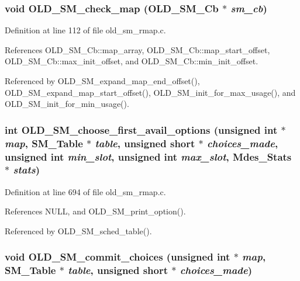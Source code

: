 \subsubsection{\setlength{\rightskip}{0pt plus 5cm}void OLD\_\-SM\_\-check\_\-map (\bf{OLD\_\-SM\_\-Cb} $\ast$ {\em sm\_\-cb})}\label{old__sm__rmap_8c_18f0c2176ab8e4618d61b0c3bdcb92fc}




Definition at line 112 of file old\_\-sm\_\-rmap.c.

References OLD\_\-SM\_\-Cb::map\_\-array, OLD\_\-SM\_\-Cb::map\_\-start\_\-offset, OLD\_\-SM\_\-Cb::max\_\-init\_\-offset, and OLD\_\-SM\_\-Cb::min\_\-init\_\-offset.

Referenced by OLD\_\-SM\_\-expand\_\-map\_\-end\_\-offset(), OLD\_\-SM\_\-expand\_\-map\_\-start\_\-offset(), OLD\_\-SM\_\-init\_\-for\_\-max\_\-usage(), and OLD\_\-SM\_\-init\_\-for\_\-min\_\-usage().
\subsubsection{\setlength{\rightskip}{0pt plus 5cm}int OLD\_\-SM\_\-choose\_\-first\_\-avail\_\-options (unsigned int $\ast$ {\em map}, SM\_\-Table $\ast$ {\em table}, unsigned short $\ast$ {\em choices\_\-made}, unsigned int {\em min\_\-slot}, unsigned int {\em max\_\-slot}, Mdes\_\-Stats $\ast$ {\em stats})}\label{old__sm__rmap_8c_582037c63a20285d19dfe12ed2dea91d}




Definition at line 694 of file old\_\-sm\_\-rmap.c.

References NULL, and OLD\_\-SM\_\-print\_\-option().

Referenced by OLD\_\-SM\_\-sched\_\-table().
\subsubsection{\setlength{\rightskip}{0pt plus 5cm}void OLD\_\-SM\_\-commit\_\-choices (unsigned int $\ast$ {\em map}, SM\_\-Table $\ast$ {\em table}, unsigned short $\ast$ {\em choices\_\-made})}\label{old__sm__rmap_8c_92eb28f97648d8884686ce4bee6766bb}





